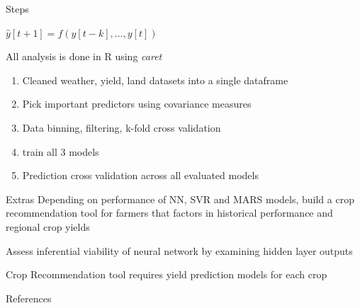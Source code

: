 \documentclass[10pt]{beamer}
\begin{document}
  \begin{frame}{Steps}
  \begin{center}
  $ \hat{y}[t+1] = f(y[t-k], ...,y[t])$
  \end{center}

  All analysis is done in R using \emph{caret}
  	\begin{enumerate}
  		\item Cleaned weather, yield, land datasets into a single dataframe
  		\item Pick important predictors using covariance measures
  		\item Data binning, filtering, k-fold cross validation
  		\item train all 3 models
  		\item Prediction cross validation across all evaluated models

  	\end{enumerate}
  \end{frame}
  \begin{frame}{Extras}
  	Depending on performance of NN, SVR and MARS models, build a crop recommendation tool for farmers that factors in historical performance and regional crop yields

  	Assess inferential viability of neural network by examining hidden layer outputs

  	Crop Recommendation tool requires yield prediction models for each crop
  \end{frame}
  \begin{frame}{References}
  	
  	
  \end{frame}
\end{document}
